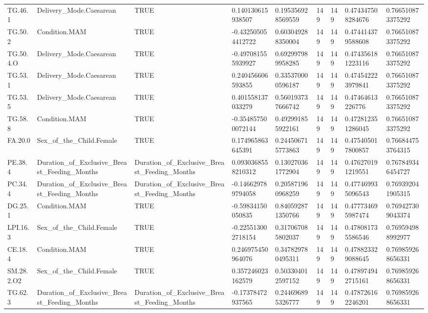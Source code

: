 \begin{longtable}{lllllllll}
TG.46.1 & Delivery\_Mode.Caesarean & TRUE & 0.140130615938507 & 0.195356928569559 & 149 & 149 & 0.474347508284676 & 0.766510873375292 \\
TG.50.2 & Condition.MAM & TRUE & -0.432505054412722 & 0.603049288350004 & 149 & 149 & 0.474414379588608 & 0.766510873375292 \\
TG.50.4.O & Delivery\_Mode.Caesarean & TRUE & -0.497081555939927 & 0.692997989958285 & 149 & 149 & 0.474356181223116 & 0.766510873375292 \\
TG.53.1 & Delivery\_Mode.Caesarean & TRUE & 0.240456606593855 & 0.335370000596187 & 149 & 149 & 0.474542223979841 & 0.766510873375292 \\
TG.53.5 & Delivery\_Mode.Caesarean & TRUE & 0.401558137033279 & 0.560193737666742 & 149 & 149 & 0.47464613226776 & 0.766510873375292 \\
TG.58.8 & Condition.MAM & TRUE & -0.354857500072144 & 0.492991855922161 & 149 & 149 & 0.472812351286045 & 0.766510873375292 \\
FA.20.0 & Sex\_of\_the\_Child.Female & TRUE & 0.174965863645391 & 0.244506715773863 & 149 & 149 & 0.475405017800857 & 0.766844753764315 \\
PE.38.4 & Duration\_of\_Exclusive\_Breast\_Feeding\_Months & Duration\_of\_Exclusive\_Breast\_Feeding\_Months & 0.0930368558210312 & 0.130270361772904 & 149 & 149 & 0.476270191219551 & 0.767849346454727 \\
PC.34.4 & Duration\_of\_Exclusive\_Breast\_Feeding\_Months & Duration\_of\_Exclusive\_Breast\_Feeding\_Months & -0.146629789794058 & 0.205871960968259 & 149 & 149 & 0.477469935096543 & 0.769392041905315 \\
DG.25.1 & Condition.MAM & TRUE & -0.59834150050835 & 0.840592871350766 & 149 & 149 & 0.477734695987474 & 0.769427309043374 \\
LPI.16.3 & Sex\_of\_the\_Child.Female & TRUE & -0.225513002718154 & 0.317067085802037 & 149 & 149 & 0.478081735586546 & 0.769594988992977 \\
CE.18.4 & Condition.MAM & TRUE & 0.246975450964076 & 0.347829780495311 & 149 & 149 & 0.478823329088645 & 0.769859268656331 \\
SM.28.2.O2 & Sex\_of\_the\_Child.Female & TRUE & 0.357246023162579 & 0.503304012597152 & 149 & 149 & 0.478974942715161 & 0.769859268656331 \\
TG.62.3 & Duration\_of\_Exclusive\_Breast\_Feeding\_Months & Duration\_of\_Exclusive\_Breast\_Feeding\_Months & -0.17378472937565 & 0.244696895326777 & 149 & 149 & 0.478726162246201 & 0.769859268656331 \\

\end{longtable}
